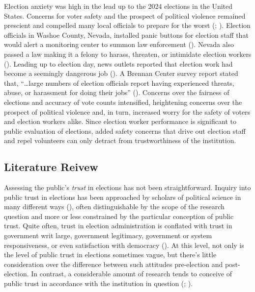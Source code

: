 \documentclass[
  12pt,
  letterpaper,
]{article}
\begin{document}
Election anxiety was high in the lead up to the 2024 elections in the
United States. Concerns for voter safety and the prospect of political
violence remained prescient and compelled many local officials to
prepare for the worst (;
). Election officials in
Washoe County, Nevada, installed panic buttons for election staff that
would alert a monitoring center to summon law enforcement
(). Nevada also passed a law
making it a felony to harass, threaten, or intimidate election workers
(). Leading up to election day, news outlets reported that election
work had become a seemingly dangerous job (). A Brennan Center survey report stated that,
``\ldots large numbers of election officials report having experienced
threats, abuse, or harassment for doing their jobs''
(). Concerns over the
fairness of elections and accuracy of vote counts intensified,
heightening concerns over the prospect of political violence and, in
turn, increased worry for the safety of voters and election workers
alike. Since election worker performance is significant to public
evaluation of elections, added safety concerns that drive out election
staff and repel volunteers can only detract from trustworthiness of the
institution.

\subsection{Literature Reivew}\label{literature-reivew}

Assessing the public's \emph{trust} in elections has not been
straightforward. Inquiry into public trust in elections has been
approached by scholars of political science in many different ways
(), often distinguishable
by the scope of the research question and more or less constrained by
the particular conception of public trust. Quite often, trust in
election administration is conflated with trust in government writ
large, government legitimacy, government or system responsiveness, or
even satisfaction with democracy (). At this level, not only is the level of public trust in
elections sometimes vague, but there's little consideration over the
difference between such attitudes pre-election and post-election. In
contrast, a considerable amount of research tends to conceive of public
trust in accordance with the institution in question
(;
).
\end{document}

